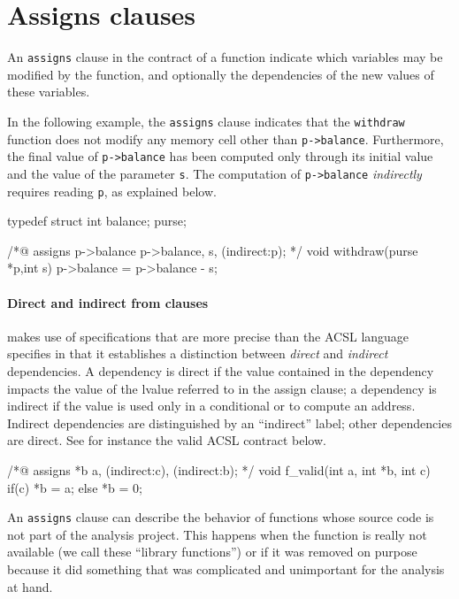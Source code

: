 \documentclass{frama-c-book}
\begin{document}
\section{Assigns clauses}
\label{annot_assigns}

An \lstinline|assigns| clause in the contract of a function indicate which
variables may be modified
by the function, and optionally the dependencies of the new values
of these variables.

In the following example, the \lstinline|assigns| clause indicates that the
\lstinline|withdraw| function does not modify any memory cell other than
\lstinline|p->balance|. Furthermore, the final value of \lstinline|p->balance|
has been computed only through its initial value and the value of the
parameter \lstinline|s|. The computation of \lstinline|p->balance|
\emph{indirectly} requires reading \lstinline|p|, as explained below.
\begin{listing}{1}
typedef struct { int balance; } purse;

/*@ assigns p->balance \from p->balance, s, (indirect:p); */
void withdraw(purse *p,int s) {
  p->balance = p->balance - s;
}
\end{listing}

\paragraph{Direct and indirect from clauses}

\Eva{} makes use of specifications that are more precise than the ACSL
language specifies in that it establishes a distinction between
\emph{direct} and \emph{indirect} dependencies. A dependency is direct
if the value contained in the dependency impacts the value of the
lvalue referred to in the assign clause; a dependency is indirect if
the value is used only in a conditional or to compute an address. Indirect
dependencies are distinguished by an ``indirect'' label; other
dependencies are direct. See for instance the valid ACSL contract
below.

\begin{listing}{1}
/*@ assigns *b \from a, (indirect:c), (indirect:b); */
void f_valid(int a, int *b, int c){
  if(c) {
    *b = a;
  }
  else
    *b = 0;
}
\end{listing}


An \lstinline|assigns| clause can describe the behavior of
functions whose source code is not part of the analysis
project. This happens when the function is really not available
(we call these ``library functions'') or if it was removed on purpose
because it did something that was complicated and unimportant
for the analysis at hand.
\end{document}
